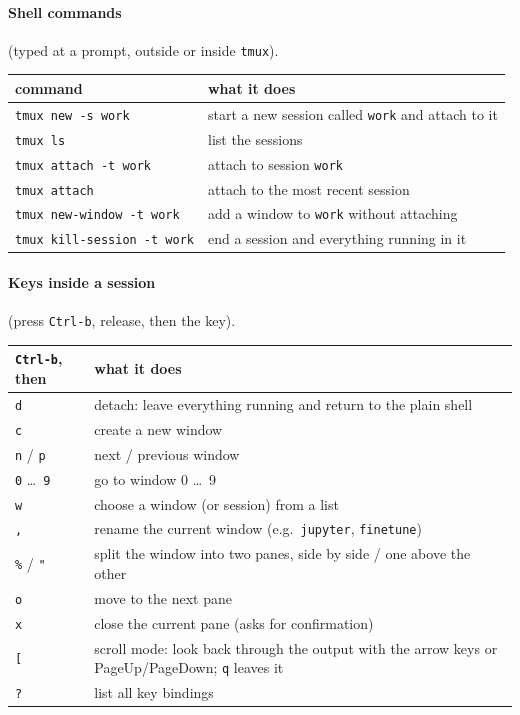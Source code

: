 \documentclass[11pt]{article}
\newcommand{\code}[1]{\texttt{#1}}
\begin{document}
\paragraph{Shell commands} (typed at a prompt, outside or inside \code{tmux}).
\begin{center}
\small
\begin{tabular}{p{}p{}}
\toprule
command & what it does\\
\midrule
\code{tmux new -s work} & start a new session called \code{work} and attach to it\\
\code{tmux ls} & list the sessions\\
\code{tmux attach -t work} & attach to session \code{work}\\
\code{tmux attach} & attach to the most recent session\\
\code{tmux new-window -t work} & add a window to \code{work} without attaching\\
\code{tmux kill-session -t work} & end a session and everything running in it\\
\bottomrule
\end{tabular}
\end{center}

\paragraph{Keys inside a session} (press \code{Ctrl-b}, release, then the key).
\begin{center}
\small
\begin{tabular}{p{}p{}}
\toprule
\code{Ctrl-b}, then & what it does\\
\midrule
\code{d} & detach: leave everything running and return to the plain shell\\
\code{c} & create a new window\\
\code{n} / \code{p} & next / previous window\\
\code{0} \ldots\ \code{9} & go to window 0 \ldots\ 9\\
\code{w} & choose a window (or session) from a list\\
\code{,} & rename the current window (e.g.\ \code{jupyter}, \code{finetune})\\
\code{\%} / \code{"} & split the window into two panes, side by side / one above the other\\
\code{o} & move to the next pane\\
\code{x} & close the current pane (asks for confirmation)\\
\code{[} & scroll mode: look back through the output with the arrow keys or
  PageUp/PageDown; \code{q} leaves it\\
\code{?} & list all key bindings\\
\bottomrule
\end{tabular}
\end{center}
\end{document}
